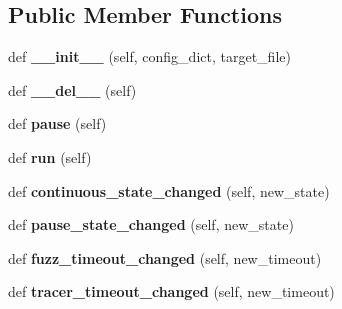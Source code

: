 \subsection*{Public Member Functions}
\begin{DoxyCompactItemize}
\item 
\mbox{\label{classharness_1_1threads_1_1_fuzzer_thread_aade63ee67f2d5cbb907949e2f6d26768}} 
def {\bfseries \+\_\+\+\_\+init\+\_\+\+\_\+} (self, config\+\_\+dict, target\+\_\+file)
\item 
\mbox{\label{classharness_1_1threads_1_1_fuzzer_thread_a0d67c1fbfd0dd2dd0fcba0fa2afb0815}} 
def {\bfseries \+\_\+\+\_\+del\+\_\+\+\_\+} (self)
\item 
\mbox{\label{classharness_1_1threads_1_1_fuzzer_thread_a766ad549a3f4fc202f86686133ede9e4}} 
def {\bfseries pause} (self)
\item 
\mbox{\label{classharness_1_1threads_1_1_fuzzer_thread_a75ac0d4679d6fb361b8344f947c19886}} 
def {\bfseries run} (self)
\item 
\mbox{\label{classharness_1_1threads_1_1_fuzzer_thread_a4723fcfd5c4491bab8a74455413e313a}} 
def {\bfseries continuous\+\_\+state\+\_\+changed} (self, new\+\_\+state)
\item 
\mbox{\label{classharness_1_1threads_1_1_fuzzer_thread_a2a73c20a9ea7a4e7a11739c6059df8e8}} 
def {\bfseries pause\+\_\+state\+\_\+changed} (self, new\+\_\+state)
\item 
\mbox{\label{classharness_1_1threads_1_1_fuzzer_thread_a773a45d5a8dbb173da50b3fbc929ddbe}} 
def {\bfseries fuzz\+\_\+timeout\+\_\+changed} (self, new\+\_\+timeout)
\item 
\mbox{\label{classharness_1_1threads_1_1_fuzzer_thread_aea1cbca0f33b812bc22ebc43c9e10eb0}} 
def {\bfseries tracer\+\_\+timeout\+\_\+changed} (self, new\+\_\+timeout)
\end{DoxyCompactItemize}
